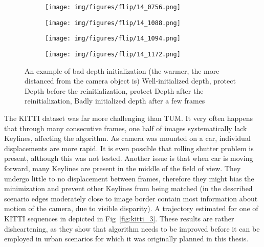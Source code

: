 \begin{figure}[ht]
	\centering
	\begin{subfigure}{0.49\textwidth}
		\centering
		\centering\texttt{[image: img/figures/flip/14\_0756.png]}
		\subcaption{\label{fig:teddyfirst}}
	\end{subfigure}
	\begin{subfigure}{0.49\textwidth}
		\centering
		\centering\texttt{[image: img/figures/flip/14\_1088.png]}
		\subcaption{\label{fig:teddybefore}}
	\end{subfigure}
	\begin{subfigure}{0.49\textwidth}
		\centering
		\centering\texttt{[image: img/figures/flip/14\_1094.png]}
		\subcaption{\label{fig:teddyafter}}
	\end{subfigure}
	\begin{subfigure}{0.49\textwidth}
		\centering
		\centering\texttt{[image: img/figures/flip/14\_1172.png]}
		\subcaption{\label{fig:teddylast}}
	\end{subfigure}
	\caption{\label{fig:teddyflip} An example of bad depth initialization (the warmer, the more distanced from the camera object is) \protect{} Well-initialized depth, protect Depth before the reinitialization, protect Depth after the reinitialization,
		\protect{} Badly initialized depth after a few frames}
\end{figure}


The KITTI dataset was far more challenging than TUM. It very often happens that through many consecutive frames, one half of images systematically lack Keylines, affecting the algorithm. As camera was mounted on a car, individual displacements are more rapid. It is even possible that rolling shutter problem is present, although this was not tested. Another issue is that when car is moving forward, many Keylines are present in the middle of the field of view. They undergo little to no displacement between frames, therefore they might bias the minimization and prevent other Keylines from being matched (in the described scenario edges moderately close to image border contain most information about motion of the camera, due to visible disparity). A trajectory estimated for one of KITTI sequences in depicted in Fig~\ref{fig:kitti_3}. These results are rather disheartening, as they show that algorithm needs to be improved before it can be employed in urban scenarios for which it was originally planned in this thesis.



